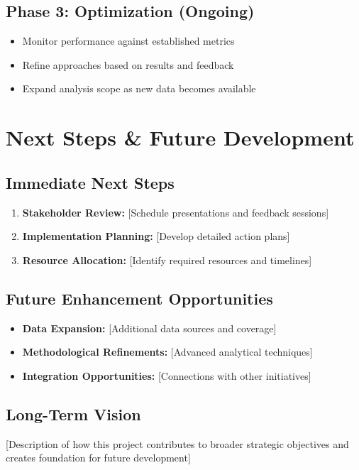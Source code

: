 \documentclass[11pt,letterpaper]{article}
\begin{document}
\subsection{Phase 3: Optimization (Ongoing)}
\begin{itemize}
    \item Monitor performance against established metrics
    \item Refine approaches based on results and feedback
    \item Expand analysis scope as new data becomes available
\end{itemize}

\section{Next Steps \& Future Development}

\subsection{Immediate Next Steps}
\begin{enumerate}
    \item \textbf{Stakeholder Review:} [Schedule presentations and feedback sessions]
    \item \textbf{Implementation Planning:} [Develop detailed action plans]
    \item \textbf{Resource Allocation:} [Identify required resources and timelines]
\end{enumerate}

\subsection{Future Enhancement Opportunities}
\begin{itemize}
    \item \textbf{Data Expansion:} [Additional data sources and coverage]
    \item \textbf{Methodological Refinements:} [Advanced analytical techniques]
    \item \textbf{Integration Opportunities:} [Connections with other initiatives]
\end{itemize}

\subsection{Long-Term Vision}
[Description of how this project contributes to broader strategic objectives and creates foundation for future development]
\end{document}
